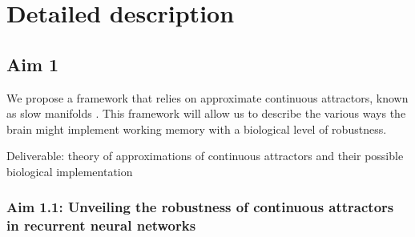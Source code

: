 \documentclass[12pt,letterpaper, onecolumn]{article}
\theoremstyle{definition}
\theoremstyle{remark}
\begin{document}



\newpage
\section{Detailed description}
\subsection*{Aim 1}
We propose a framework that relies on approximate continuous attractors, known as slow manifolds \citep{ghazizadeh2021slow}. %
This framework will allow us to describe the various ways the brain might implement working memory with a biological level of robustness.

\noindent
Deliverable: theory of approximations of continuous attractors and their possible biological implementation 

\subsubsection*{Aim 1.1: Unveiling the robustness of continuous attractors in recurrent neural networks}
\end{document}
